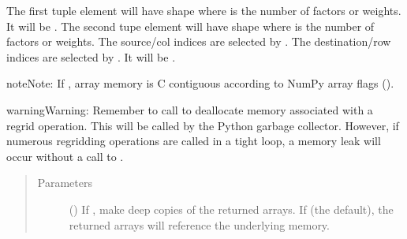 \documentclass[letterpaper,10pt,english]{sphinxmanual}
\begin{document}
\begin{fulllineitems}
\begin{fulllineitems}
\begin{sphinxVerbatim}[commandchars=\\\{\}]
   
\end{sphinxVerbatim}

The first tuple element  will have shape  where
 is the number of factors or weights. It will be .
The second tupe element  will have shape 
where  is the number of factors or weights. The source/col indices
are selected by . The destination/row indices
are selected by . It will be .

\begin{sphinxadmonition}{note}{Note:}
If , array memory is C contiguous according
to NumPy array flags ().
\end{sphinxadmonition}

\begin{sphinxadmonition}{warning}{Warning:}
Remember to call  to deallocate
memory associated with a regrid operation. This will be called by
the Python garbage collector. However, if numerous regridding operations
are called in a tight loop, a memory leak will occur without a call
to .
\end{sphinxadmonition}
\begin{quote}\begin{description}
\item[{Parameters}] \leavevmode
{} () \textendash{} If , make deep copies of the returned
arrays. If  (the default), the returned arrays will reference
the underlying  memory.


\end{description}
\end{quote}
\end{fulllineitems}
\end{fulllineitems}
\end{document}
